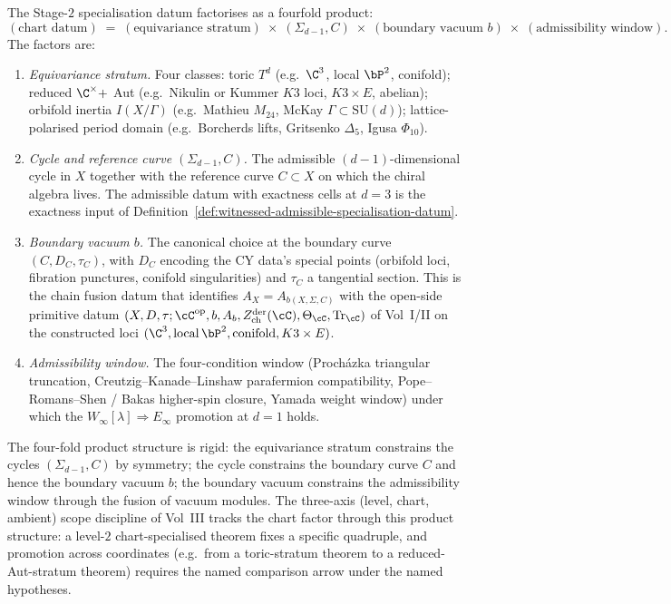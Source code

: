 \begin{remark}
\label{rem:chart-datum-product-structure}
The Stage-$2$ specialisation datum factorises as a fourfold product:
\[
 (\text{chart datum}) \;=\; (\text{equivariance stratum}) \;\times\; (\Sigma_{d-1}, C) \;\times\; (\text{boundary vacuum } b) \;\times\; (\text{admissibility window}).
\]
The factors are:
\begin{enumerate}[label=\textup{(\arabic*)},leftmargin=2em,itemsep=1pt]
\item \emph{Equivariance stratum.} Four classes:
toric $T^d$ (e.g.\ $\C^3$, local $\bP^2$, conifold);
reduced $\C^\times +$ Aut (e.g.\ Nikulin or Kummer $K3$ loci,
$K3 \times E$, abelian);
orbifold inertia $I(X / \Gamma)$ (e.g.\ Mathieu $M_{24}$, McKay
$\Gamma \subset \mathrm{SU}(d)$);
lattice-polarised period domain (e.g.\ Borcherds lifts, Gritsenko
$\Delta_5$, Igusa $\Phi_{10}$).
\item \emph{Cycle and reference curve $(\Sigma_{d-1}, C)$.} The
admissible $(d - 1)$-dimensional cycle in $X$ together with the
reference curve $C \subset X$ on which the chiral algebra lives.
The admissible datum with exactness cells at $d = 3$ is the exactness input of
Definition~\ref{def:witnessed-admissible-specialisation-datum}.
\item \emph{Boundary vacuum $b$.} The canonical choice at the
boundary curve $(C, D_C, \tau_C)$, with $D_C$ encoding the CY data's
special points (orbifold loci, fibration punctures, conifold
singularities) and $\tau_C$ a tangential section. This is the chain
fusion datum that identifies $A_X = A_{b(X, \Sigma, C)}$ with the
open-side primitive datum
$(X, D, \tau; \cC^{\mathrm{op}}, b, A_b, Z^{\mathrm{der}}_{\mathrm{ch}}(\cC),
\Theta_\cC, \mathrm{Tr}_\cC)$ of Vol~I/II on the constructed loci
$(\C^3, \mathrm{local}\,\bP^2, \mathrm{conifold}, K3 \times E)$.
\item \emph{Admissibility window.} The four-condition window
(Proch\'azka triangular truncation, Creutzig--Kanade--Linshaw
parafermion compatibility, Pope--Romans--Shen / Bakas higher-spin
closure, Yamada weight window) under which the
$W_\infty[\lambda] \Rightarrow E_\infty$ promotion at $d = 1$ holds.
\end{enumerate}
The four-fold product structure is rigid: the equivariance stratum
constrains the cycles $(\Sigma_{d-1}, C)$ by symmetry; the cycle
constrains the boundary curve $C$ and hence the boundary vacuum $b$;
the boundary vacuum constrains the admissibility window through the
fusion of vacuum modules. The three-axis (level, chart, ambient)
scope discipline of Vol~III tracks the chart factor through this
product structure: a level-$2$ chart-specialised theorem fixes a
specific quadruple, and promotion across coordinates (e.g.\ from a
toric-stratum theorem to a reduced-Aut-stratum theorem) requires the
named comparison arrow under the named hypotheses.
\end{remark}

